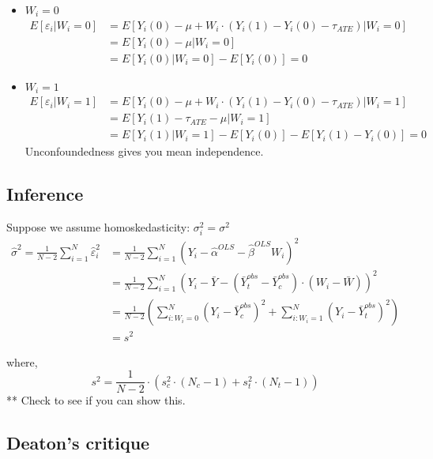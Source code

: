 \documentclass[
  letterpaper,
  DIV=11,
  numbers=noendperiod]{scrreprt}
\providecommand{\tightlist}{%
  \setlength{\itemsep}{0pt}\setlength{\parskip}{0pt}}\usepackage{longtable,booktabs,array}
\theoremstyle{definition}
\theoremstyle{remark}
\begin{document}
\par

\begin{itemize}
\tightlist
\item
  \(W_i=0\) \[
          \begin{align*}
              E[\varepsilon_i|W_i=0] &= E[Y_i(0)- \mu + W_i\cdot(Y_i(1)-Y_i(0)-\tau_{ATE})|W_i=0] \\
              &= E[Y_i(0)- \mu|W_i=0] \\
              &=E[Y_i(0)|W_i=0]-E[Y_i(0)] = 0
          \end{align*}
  \]
\item
  \(W_i=1\) \[
          \begin{align*}
              E[\varepsilon_i|W_i=1] &= E[Y_i(0)- \mu + W_i\cdot(Y_i(1)-Y_i(0)-\tau_{ATE})|W_i=1] \\
              &= E[Y_i(1)-\tau_{ATE} - \mu|W_i=1] \\
              &=E[Y_i(1)|W_i=1]-E[Y_i(0)]-E[Y_i(1)-Y_i(0)] = 0
          \end{align*}
  \] Unconfoundedness gives you mean independence.
\end{itemize}

\subsection{Inference}\label{inference}

Suppose we assume homoskedasticity: \(\sigma_i^2=\sigma^2\)\\
\[
        \begin{align*}
            \hat{\sigma}^2 = \frac{1}{N-2}\sum_{i=1}^N \hat{\varepsilon}_i^2&= \frac{1}{N-2}\sum_{i=1}^N  (Y_i-\hat{\alpha}^{OLS}-\hat{\beta}^{OLS}W_i)^2 \\
            &=\frac{1}{N-2}\sum_{i=1}^N  \left(Y_i-\bar{Y}-(\bar{Y}^{obs}_t-\bar{Y}^{obs}_c)\cdot(W_i-\bar{W})\right)^2 \\
            &=\frac{1}{N-2}\left(\sum_{i:W_i=0}^N(Y_i-\bar{Y}^{obs}_c)^2+\sum_{i:W_i=1}^N(Y_i-\bar{Y}^{obs}_t)^2\right) \\
            &=s^2
        \end{align*}
\]

where, \[
        s^2 = \frac{1}{N-2}\cdot\left(s^2_c\cdot(N_c-1)+s^2_t\cdot(N_t-1)\right)
\] ** Check to see if you can show this.

\subsection{Deaton's critique}\label{deatons-critique}
\end{document}
